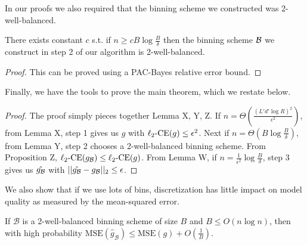 In our proofs we also required that the binning scheme we constructed was 2-well-balanced.

\begin{lemma}
There exists constant $c$ s.t. if $n \geq c B \log{\frac{B}{\delta}}$ then the binning scheme $\mathcal{B}{}$ we construct in step 2 of our algorithm is 2-well-balanced.
\end{lemma}

\begin{proof}
This can be proved using a PAC-Bayes relative error bound.
\end{proof}

Finally, we have the tools to prove the main theorem, which we restate below.

\finalCalib*{}

\begin{proof}
The proof simply pieces together Lemma X, Y, Z.
If $n = \Theta(\frac{(L'd'\log{R})^2}{\epsilon^2})$, from Lemma X, step 1 gives us $g$ with $\ell_2\mbox{-CE}(g) \leq \epsilon^2$.
Next if $n = \Theta(B \log{\frac{B}{\delta}})$, from Lemma Y, step 2 chooses a 2-well-balanced binning scheme.
From Proposition Z, $\ell_2\mbox{-CE}(g_{\mathcal{B}{}}) \leq \ell_2\mbox{-CE}(g)$.
From Lemma W, if $n = \frac{1}{\epsilon^2} \log{\frac{B}{\delta}}$, step 3 gives us $\hat{g_{\mathcal{B}{}}}$ with $||\hat{g_{\mathcal{B}{}}} - g_{\mathcal{B}{}}||_2 \leq \epsilon$.

\end{proof}

We also show that if we use lots of bins, discretization has little impact on model quality as measured by the mean-squared error.

\begin{theorem}
\label{thm:sharpness-bound}
If $\mathcal{B}$ is a 2-well-balanced binning scheme of size $B$ and $B \leq O(n\log{n})$, then with high probability $\mbox{MSE}(\hat{g}_{\mathcal{B}}) \leq \mbox{MSE}(g) + O(\frac{1}{B})$.
\end{theorem}



















